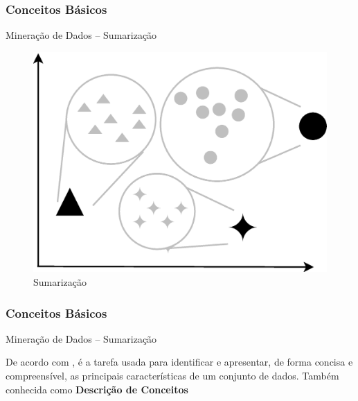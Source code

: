 \documentclass[hyperref={pdfpagelabels=false}]{beamer}
\begin{document}
\begin{frame}
	\frametitle{Conceitos Básicos}
    
    	\Large{Mineração de Dados -- Sumarização}
        \begin{figure}
		\centering
	    \includegraphics[scale=0.3]{img/Summarization.eps}
        \caption{\scriptsize{Sumarização}}
		\end{figure}
    

\end{frame}

\begin{frame}

	\frametitle{Conceitos Básicos}
    
    \Large{Mineração de Dados -- Sumarização}\linebreak
    \normalsize
   
    De acordo com \cite{goldschmidt2015data}, é a tarefa usada para identificar e apresentar, de forma concisa e compreensível, as principais características de um conjunto de dados.
    \linebreak\linebreak Também conhecida como \textbf{Descrição de Conceitos}

\end{frame}
\end{document}
